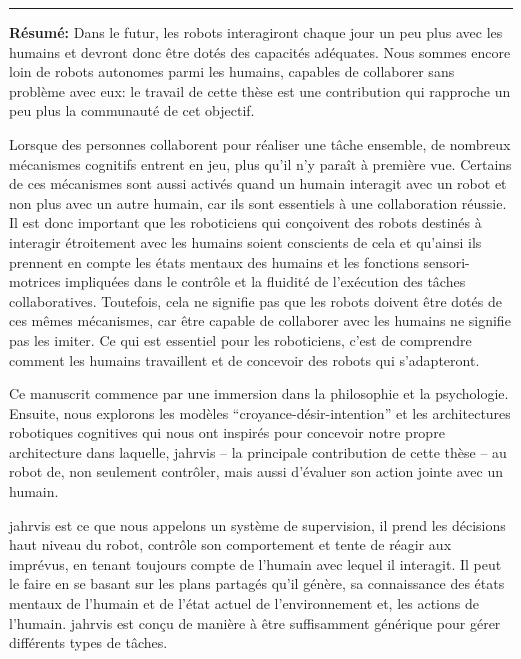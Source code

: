 \documentclass[english,a4paper,11pt,twoside]{StyleThese}
\begin{document}


%



\cleardoublepage
\thispagestyle{empty}
\begin{vcenterpage}
\noindent\rule{\textwidth}{0.5pt}

\textbf{Résumé:} Dans le futur, les robots interagiront chaque jour un peu plus avec les humains et devront donc être dotés des capacités adéquates. Nous sommes encore loin de robots autonomes parmi les humains, capables de collaborer sans problème avec eux: le travail de cette thèse est une contribution qui rapproche un peu plus la communauté de cet objectif. 

Lorsque des personnes collaborent pour réaliser une tâche ensemble, de nombreux mécanismes cognitifs entrent en jeu, plus qu’il n’y paraît à première vue. Certains de ces mécanismes sont aussi activés quand un humain interagit avec un robot et non plus avec un autre humain, car ils sont essentiels à une collaboration réussie. Il est donc important que les roboticiens qui conçoivent des robots destinés à interagir étroitement avec les humains soient conscients de cela et qu’ainsi ils prennent en compte les états mentaux des humains et les fonctions sensori-motrices impliquées dans le contrôle et la fluidité de l'exécution des tâches collaboratives. Toutefois, cela ne signifie pas que les robots doivent être dotés de ces mêmes mécanismes, car être capable de collaborer avec les humains ne signifie pas les imiter. Ce qui est essentiel pour les roboticiens, c'est de comprendre comment les humains travaillent et de concevoir des robots qui s'adapteront. 

Ce manuscrit commence par une immersion dans la philosophie et la psychologie. Ensuite, nous explorons les modèles ``croyance-désir-intention'' et les architectures robotiques cognitives qui nous ont inspirés pour concevoir notre propre architecture dans laquelle, \acrshort{jahrvis} -- la principale contribution de cette thèse -- au robot de, non seulement contrôler, mais aussi d'évaluer son action jointe avec un humain. 

\acrfull{jahrvis} est ce que nous appelons un système de supervision, \ie il prend les décisions haut niveau du robot, contrôle son comportement et tente de réagir aux imprévus, en tenant toujours compte de l'humain avec lequel il interagit. Il peut le faire en se basant sur les plans partagés qu’il génère, sa connaissance des états mentaux de l'humain et de l'état actuel de l'environnement et, les actions de l'humain. \acrshort{jahrvis} est conçu de manière à être suffisamment générique pour gérer différents types de tâches.


\end{vcenterpage}
\end{document}
